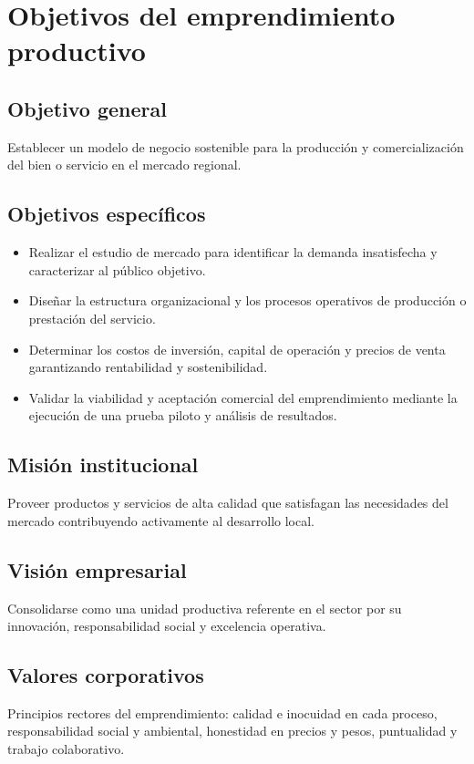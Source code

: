 \section{Objetivos del emprendimiento productivo}
\label{sec:objetivos_emprendimiento}

\subsection{Objetivo general}
Establecer un modelo de negocio sostenible para la producción y comercialización del bien o servicio en el mercado regional.

\subsection{Objetivos específicos}
\begin{itemize}
    \item Realizar el estudio de mercado para identificar la demanda insatisfecha y caracterizar al público objetivo.
    \item Diseñar la estructura organizacional y los procesos operativos de producción o prestación del servicio.
    \item Determinar los costos de inversión, capital de operación y precios de venta garantizando rentabilidad y sostenibilidad.
    \item Validar la viabilidad y aceptación comercial del emprendimiento mediante la ejecución de una prueba piloto y análisis de resultados.
\end{itemize}

\subsection{Misión institucional}
Proveer productos y servicios de alta calidad que satisfagan las necesidades del mercado contribuyendo activamente al desarrollo local.

\subsection{Visión empresarial}
Consolidarse como una unidad productiva referente en el sector por su innovación, responsabilidad social y excelencia operativa.

\subsection{Valores corporativos}
Principios rectores del emprendimiento: calidad e inocuidad en cada proceso, responsabilidad social y ambiental, honestidad en precios y pesos, puntualidad y trabajo colaborativo.
